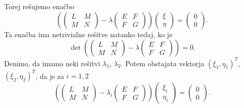     Torej rešujemo enačbo \begin{equation*}
      \left(
        \begin{pmatrix}
      L & M \\
      M & N
      \end{pmatrix}  - \lambda \begin{pmatrix}
    E & F \\
    F & G
    \end{pmatrix} \right) \begin{pmatrix}
        \xi \\
        \eta
    \end{pmatrix} =  \begin{pmatrix}
        0 \\
        0
    \end{pmatrix}.
    \end{equation*}  
     Ta enačba ima netrivialne rešitve natanko tedaj, ko je \begin{equation*}
       \det \left( 
        \begin{pmatrix}
      L & M \\
      M & N
      \end{pmatrix}  - \lambda \begin{pmatrix}
    E & F \\
    F & G
    \end{pmatrix} \right) = 0.
     \end{equation*}  
     Denimo, da imamo neki rešitvi $\lambda_1$, $\lambda_2$. Potem obstajata vektorja $(\xi_1, \eta_1)^{T}$, $(\xi_2, \eta_2)^{T}$, da je za $i = 1,2$
     \begin{equation*}
        \left(
            \begin{pmatrix}
          L & M \\
          M & N
          \end{pmatrix}  - \lambda_i \begin{pmatrix}
        E & F \\
        F & G
        \end{pmatrix} \right) \begin{pmatrix}
            \xi_i \\
            \eta_i
        \end{pmatrix} =  \begin{pmatrix}
            0 \\
            0
        \end{pmatrix}.
     \end{equation*}  
